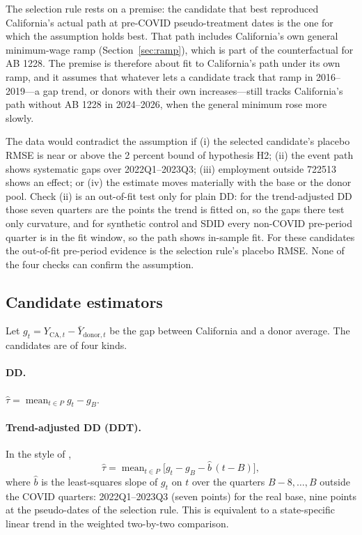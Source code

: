 The selection rule rests on a premise: the candidate that best reproduced California's actual path
at pre-COVID pseudo-treatment dates is the one for which the assumption holds best. That path
includes California's own general minimum-wage ramp (Section~\ref{sec:ramp}), which is part of the
counterfactual for AB 1228. The premise is therefore about fit to California's path under its own
ramp, and it assumes that whatever lets a candidate track that ramp in 2016--2019---a gap trend, or
donors with their own increases---still tracks California's path without AB 1228 in 2024--2026,
when the general minimum rose more slowly.

The data would contradict the assumption if (i) the selected candidate's placebo RMSE is near or
above the 2 percent bound of hypothesis H2; (ii) the event path shows systematic gaps over
2022Q1--2023Q3; (iii) employment outside 722513 shows an effect; or (iv) the estimate moves
materially with the base or the donor pool. Check (ii) is an out-of-fit test only for plain DD: for
the trend-adjusted DD those seven quarters are the points the trend is fitted on, so the gaps there
test only curvature, and for synthetic control and SDID every non-COVID pre-period quarter is in the
fit window, so the path shows in-sample fit. For these candidates the out-of-fit pre-period evidence
is the selection rule's placebo RMSE. None of the four checks can confirm the assumption.

\subsection{Candidate estimators}
\label{sec:candidates}

Let $g_t = Y_{\mathrm{CA},t} - \bar Y_{\mathrm{donor},t}$ be the gap between California and a donor
average. The candidates are of four kinds.

\paragraph{DD.} $\hat\tau = \operatorname{mean}_{t\in P} g_t - g_B$.

\paragraph{Trend-adjusted DD (DDT).} In the style of \citet{clemens2026employment},
\begin{equation}
\hat\tau = \operatorname{mean}_{t\in P}\bigl[g_t - g_B - \hat b\,(t - B)\bigr],
\end{equation}
where $\hat b$ is the least-squares slope of $g_t$ on $t$ over the quarters $B-8, \dots, B$ outside
the COVID quarters: 2022Q1--2023Q3 (seven points) for the real base, nine points at the
pseudo-dates of the selection rule. This is equivalent to a state-specific linear trend in the
weighted two-by-two comparison.

